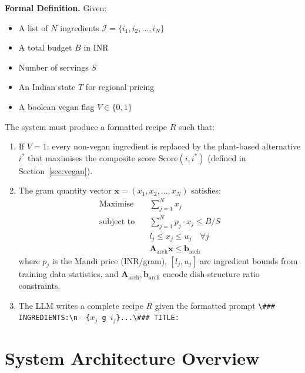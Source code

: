 \documentclass[12pt, a4paper]{article}
\begin{document}
\textbf{Formal Definition.}  Given:
\begin{itemize}
  \item A list of $N$ ingredients $\mathcal{I} = \{i_1, i_2, \ldots, i_N\}$
  \item A total budget $B$ in INR
  \item Number of servings $S$
  \item An Indian state $T$ for regional pricing
  \item A boolean vegan flag $V \in \{0,1\}$
\end{itemize}

The system must produce a formatted recipe $R$ such that:

\begin{enumerate}
  \item If $V=1$: every non-vegan ingredient is replaced by the plant-based alternative $i^*$ that maximises the composite score $\text{Score}(i, i^*)$ (defined in Section~\ref{sec:vegan}).
  \item The gram quantity vector $\mathbf{x} = (x_1, x_2, \ldots, x_N)$ satisfies:
    \begin{align}
      \text{Maximise} \quad & \sum_{j=1}^{N} x_j \label{eq:obj}\\
      \text{subject to} \quad & \sum_{j=1}^{N} p_j \cdot x_j \leq B / S \label{eq:budget}\\
      & l_j \leq x_j \leq u_j \quad \forall j \label{eq:bounds}\\
      & \mathbf{A}_{\text{arch}} \mathbf{x} \leq \mathbf{b}_{\text{arch}} \label{eq:arch}
    \end{align}
    where $p_j$ is the Mandi price (INR/gram), $[l_j, u_j]$ are ingredient bounds from training data statistics, and $\mathbf{A}_{\text{arch}}, \mathbf{b}_{\text{arch}}$ encode dish-structure ratio constraints.
  \item The LLM writes a complete recipe $R$ given the formatted prompt
    \texttt{\textbackslash\#\#\# INGREDIENTS:\textbackslash n- \{$x_j$ g $i_j$\}...\allowbreak\textbackslash\#\#\# TITLE:}
\end{enumerate}

\section{System Architecture Overview}
\end{document}
